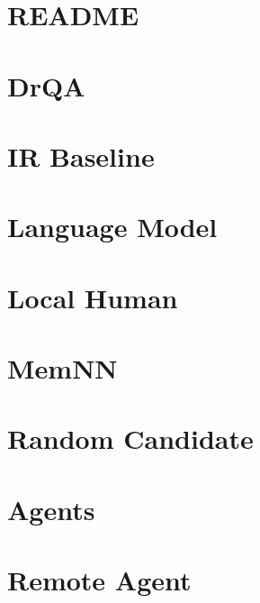 \documentclass[twoside]{book}
\newcommand{\+}{\discretionary{\mbox{\scriptsize$\hookleftarrow$}}{}{}}
\begin{document}
\chapter{R\+E\+A\+D\+ME}
\label{md_parlai_agents_bert_ranker_README}

\chapter{Dr\+QA}
\label{md_parlai_agents_drqa_README}

\chapter{IR Baseline}
\label{md_parlai_agents_ir_baseline_README}

\chapter{Language Model}
\label{md_parlai_agents_language_model_README}

\chapter{Local Human}
\label{md_parlai_agents_local_human_README}

\chapter{Mem\+NN}
\label{md_parlai_agents_memnn_README}

\chapter{Random Candidate}
\label{md_parlai_agents_random_candidate_README}

\chapter{Agents}
\label{md_parlai_agents_README}

\chapter{Remote Agent}
\label{md_parlai_agents_remote_agent_README}

\end{document}
